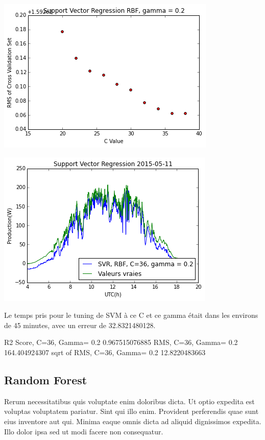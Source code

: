 \documentclass[a4paper]{article}
\begin{document}
\begin{multicols}{2}
\includegraphics[width=\textwidth/2]{./svmselectc.png}

\includegraphics[width=\textwidth/2]{./11maysvm.png}

Le temps pris pour le tuning de SVM à ce C et ce gamma était dans les environs de 45 minutes, avec un erreur de 32.8321480128. 

R2 Score, C=36, Gamma= 0.2
0.967515076885
RMS, C=36, Gamma= 0.2
164.404924307
sqrt of RMS, C=36, Gamma= 0.2
12.8220483663

\subsection{Random Forest}
Rerum necessitatibus quis voluptate enim doloribus dicta. Ut optio expedita est
    voluptas voluptatem pariatur. Sint qui illo enim. Provident perferendis quae
    sunt eius inventore aut qui. Minima eaque omnis dicta ad aliquid dignissimos
    expedita. Illo dolor ipsa sed ut modi facere non consequatur.


\end{multicols}
\end{document}
